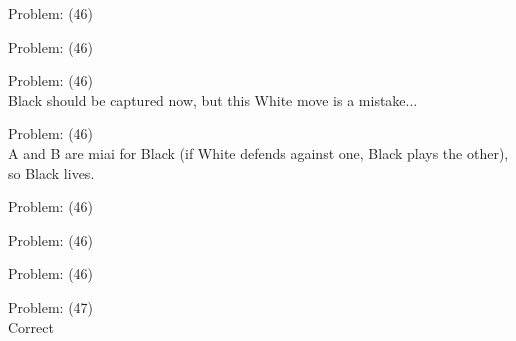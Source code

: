 \documentclass[11pt]{article}
\begin{document}
\begin{minipage}[t]{0.5\textwidth}
  {\centering
  
Problem: (46)\\
  }
\end{minipage}
\begin{minipage}[t]{0.5\textwidth}
  {\centering
  
Problem: (46)\\
  }
\end{minipage}
\begin{minipage}[t]{0.5\textwidth}
  {\centering
  
Problem: (46)\\
Black should be captured now, but this White move is a mistake...\\
  }
\end{minipage}
\begin{minipage}[t]{0.5\textwidth}
  {\centering
  
Problem: (46)\\
A and B are miai for Black (if White defends against one, Black plays the other), so Black lives.\\
  }
\end{minipage}
\begin{minipage}[t]{0.5\textwidth}
  {\centering
  
Problem: (46)\\
  }
\end{minipage}
\begin{minipage}[t]{0.5\textwidth}
  {\centering
  
Problem: (46)\\
  }
\end{minipage}
\begin{minipage}[t]{0.5\textwidth}
  {\centering
  
Problem: (46)\\
  }
\end{minipage}
\begin{minipage}[t]{0.5\textwidth}
  {\centering
  
Problem: (47)\\
Correct\\
  }
\end{minipage}
\end{document}
